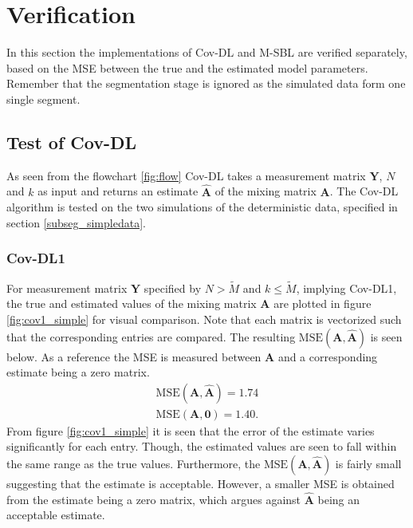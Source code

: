 \section{Verification}
In this section the implementations of Cov-DL and M-SBL are verified separately, based on the MSE between the true and the estimated model parameters.
Remember that the segmentation stage is ignored as the simulated data form one single segment.    

\subsection{Test of Cov-DL}
As seen from the flowchart \ref{fig:flow} Cov-DL takes a measurement matrix $\mathbf{Y}$, $N$ and $k$ as input and returns an estimate $\hat{\mathbf{A}}$ of the mixing matrix $\mathbf{A}$. 
The Cov-DL algorithm is tested on the two simulations of the deterministic data, specified in section \ref{subseg_simpledata}. 

\subsubsection{Cov-DL1}
For measurement matrix $\mathbf{Y}$ specified by $N > \widetilde{M}$ and $k \leq \widetilde{M}$, implying Cov-DL1, the true and estimated values of the mixing matrix $\mathbf{A}$ are plotted in figure \ref{fig:cov1_simple} for visual comparison. 
Note that each matrix is vectorized such that the corresponding entries are compared.  
The resulting $\text{MSE}(\mathbf{A}, \hat{\mathbf{A}})$ is seen below. 
As a reference the MSE is measured between $\mathbf{A}$ and a corresponding estimate being a zero matrix.   
\begin{align*}
\text{MSE}(\mathbf{A}, \hat{\mathbf{A}}) = 1.74 \\
\text{MSE}(\mathbf{A}, \mathbf{0}) = 1.40.
\end{align*}
From figure \ref{fig:cov1_simple} it is seen that the error of the estimate varies significantly for each entry. 
Though, the estimated values are seen to fall within the same range as the true values.
Furthermore, the $\text{MSE}(\mathbf{A}, \hat{\mathbf{A}})$ is fairly small suggesting that the estimate is acceptable. However, a smaller MSE is obtained from the estimate being a zero matrix, which argues against $\hat{\mathbf{A}}$ being an acceptable estimate. 


